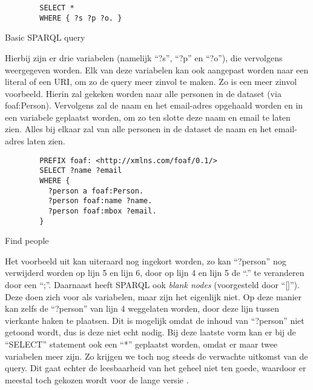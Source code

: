 \begin{listing}[ht]
    \begin{verbatim}
        SELECT *
        WHERE { ?s ?p ?o. }
    \end{verbatim}
    \caption{Basic SPARQL query}
    \label{listing:basic_sparql_query}
\end{listing}

Hierbij zijn er drie variabelen (namelijk ``?s'', ``?p'' en ``?o''), die vervolgens weergegeven worden. Elk van deze variabelen kan ook aangepast worden naar een literal of een URI, om zo de query meer zinvol te maken. Zo is  een meer zinvol voorbeeld. Hierin zal gekeken worden naar alle personen in de dataset (via foaf:Person). Vervolgens zal de naam en het email-adres opgehaald worden en in een variabele geplaatst worden, om zo ten slotte deze naam en email te laten zien. Alles bij elkaar zal  van alle personen in de dataset de naam en het email-adres laten zien.

\begin{listing}[ht]
    \begin{verbatim}
        PREFIX foaf: <http://xmlns.com/foaf/0.1/>
        SELECT ?name ?email
        WHERE {
          ?person a foaf:Person.
          ?person foaf:name ?name.
          ?person foaf:mbox ?email.
        }
    \end{verbatim}
    \caption{Find people}
    \label{listing:find_people_sparql_query}
\end{listing}

Het voorbeeld uit  kan uiteraard nog ingekort worden, zo kan ``?person'' nog verwijderd worden op lijn 5 en lijn 6, door op lijn 4 en lijn 5 de ``.'' te veranderen door een ``;''. Daarnaast heeft SPARQL ook \textit{blank nodes} (voorgesteld door ``[]''). Deze doen zich voor als variabelen, maar zijn het eigenlijk niet. Op deze manier kan zelfs de ``?person'' van lijn 4 weggelaten worden, door deze lijn tussen vierkante haken te plaatsen. Dit is mogelijk omdat de inhoud van ``?person'' niet getoond wordt, dus is deze niet echt nodig. Bij deze laatste vorm kan er bij de ``SELECT'' statement ook een ``*'' geplaatst worden, omdat er maar twee variabelen meer zijn. Zo krijgen we toch nog steeds de verwachte uitkomst van de query. Dit gaat echter de leesbaarheid van het geheel niet ten goede, waardoor er meestal toch gekozen wordt voor de lange versie \cite{sparql2013querylanguage}.

